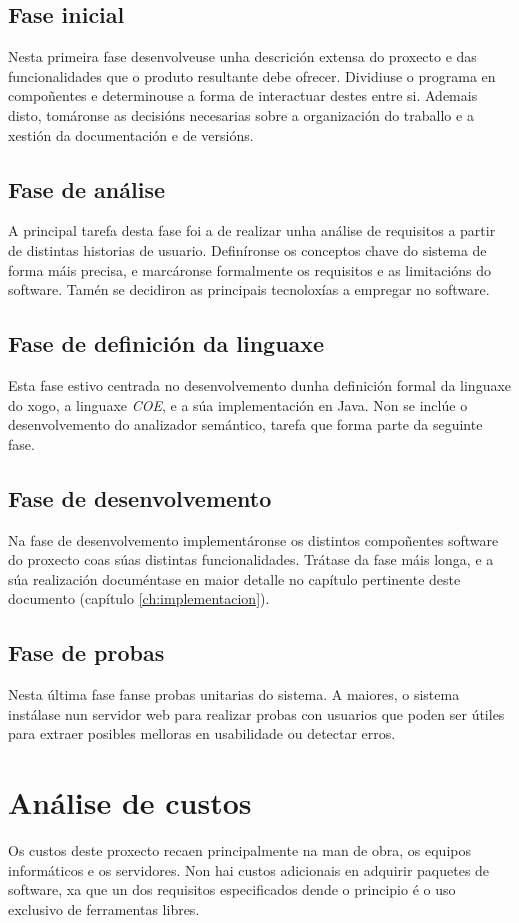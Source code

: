 \subsection{Fase inicial}
Nesta primeira fase desenvolveuse unha descrición extensa do proxecto e das
funcionalidades que o produto resultante debe ofrecer. Dividiuse o programa en
compoñentes e determinouse a forma de interactuar destes entre si. Ademais
disto, tomáronse as decisións necesarias sobre a organización do traballo e a
xestión da documentación e de versións.

\subsection{Fase de análise}
A principal tarefa desta fase foi a de realizar unha análise de requisitos a
partir de distintas historias de usuario. Definíronse os conceptos chave do
sistema de forma máis precisa, e marcáronse formalmente os requisitos e as
limitacións do software. Tamén se decidiron as principais tecnoloxías a
empregar no software.

\subsection{Fase de definición da linguaxe}
Esta fase estivo centrada no desenvolvemento dunha definición formal da linguaxe
do xogo, a linguaxe {\it COE}, e a súa implementación en Java. Non se inclúe o
desenvolvemento do analizador semántico, tarefa que forma parte da seguinte
fase.

\subsection{Fase de desenvolvemento}
Na fase de desenvolvemento implementáronse os distintos compoñentes software do
proxecto coas súas distintas funcionalidades. Trátase da fase máis longa, e a
súa realización documéntase en maior detalle no capítulo pertinente deste
documento (capítulo \ref{ch:implementacion}).

\subsection{Fase de probas}
Nesta última fase fanse probas unitarias do sistema. A maiores, o sistema
instálase nun servidor web para realizar probas con usuarios que poden ser
útiles para extraer posibles melloras en usabilidade ou detectar erros. 

\section{Análise de custos}
Os custos deste proxecto recaen principalmente na man de obra, os equipos
informáticos e os servidores. Non hai custos adicionais en adquirir paquetes de
software, xa que un dos requisitos especificados dende o principio é o uso
exclusivo de ferramentas libres.

